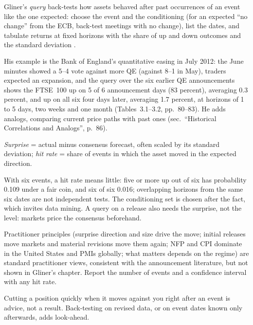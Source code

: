 \begin{qfmethod}\label{meth:macro-event-queries}
 Gliner's \emph{query} back-tests how assets behaved after past occurrences of an event like the one expected: choose the event and the conditioning (for an expected ``no change'' from the ECB, back-test meetings with no change), list the dates, and tabulate returns at fixed horizons with the share of up and down outcomes and the standard deviation \citep[chap.~3, secs.\ ``Simple Back-Tests and Queries'' and ``An Example of Building a Query'', PDF pp.~79--85]{s7-gliner}.

His example is the Bank of England's quantitative easing in July 2012: the June minutes showed a 5--4 vote against more QE (against 8--1 in May), traders expected an expansion, and the query over the six earlier QE announcements shows the FTSE~100 up on 5 of 6 announcement days (83 percent), averaging 0.3 percent, and up on all six four days later, averaging 1.7 percent, at horizons of 1 to 5 days, two weeks and one month (Tables~3.1--3.2, pp.~80--83). He adds analogs, comparing current price paths with past ones (sec.\ ``Historical Correlations and Analogs'', p.~86).

 \emph{Surprise} = actual minus consensus forecast, often scaled by its standard deviation; \emph{hit rate} = share of events in which the asset moved in the expected direction.

 With six events, a hit rate means little: five or more up out of six has probability 0.109 under a fair coin, and six of six 0.016; overlapping horizons from the same six dates are not independent tests. The conditioning set is chosen after the fact, which invites data mining. A query on a release also needs the surprise, not the level: markets price the consensus beforehand.

 Practitioner principles (surprise direction and size drive the move; initial releases move markets and material revisions move them again; NFP and CPI dominate in the United States and PMIs globally; what matters depends on the regime) are standard practitioner views, consistent with the announcement literature, but not shown in Gliner's chapter. Report the number of events and a confidence interval with any hit rate.

 Cutting a position quickly when it moves against you right after an event is advice, not a result. Back-testing on revised data, or on event dates known only afterwards, adds look-ahead.


\end{qfmethod}
